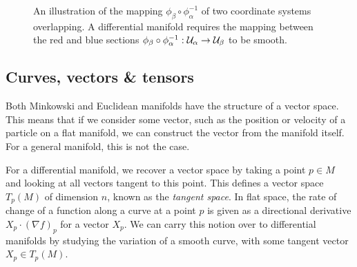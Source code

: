 \begin{figure}[!h]
\label{fig:diffmanifold}
\caption[Illustration of the mapping for differential manifolds]{An illustration of the mapping $\phi_\beta \circ \phi^{-1}_\alpha$ of two coordinate systems overlapping. A differential manifold requires the mapping between the red and blue sections $\phi_\beta \circ \phi^{-1}_\alpha: {\cal U}_\alpha \rightarrow {\cal U}_\beta$ to be smooth.}
\end{figure}



\subsection{Curves, vectors \& tensors}

Both Minkowski and Euclidean manifolds have the structure of a vector space. This means that if we consider some vector, such as the position or velocity of a particle on a flat manifold, we can construct the vector from the manifold itself. For a general manifold, this is not the case. 

For a differential manifold, we recover a vector space by taking a point $p \in M$ and looking at all vectors tangent to this point. This defines a vector space $T_p(M)$ of dimension $n$, known as the \textit{tangent space}. In flat space, the rate of change of a function along a curve at a point $p$ is given as a directional derivative $X_p \cdot (\nabla f)_p$ for a vector $X_p$. We can carry this notion over to differential manifolds by studying the variation of a smooth curve, with some tangent vector $X_p \in T_p(M)$.

